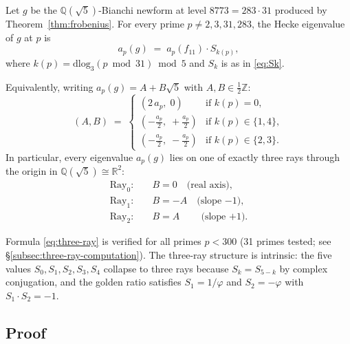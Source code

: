 \begin{theorem}
\label{thm:three-ray}
Let $g$ be the $\mathbb{Q}(\sqrt{5})$-Bianchi newform at level $8773 = 283
\cdot 31$ produced by Theorem~\ref{thm:frobenius}. For every prime
$p \neq 2, 3, 31, 283$, the Hecke eigenvalue of $g$ at $p$ is
\begin{equation}
\label{eq:three-ray}
  a_p(g) \;=\; a_p(f_{11}) \cdot S_{k(p)},
\end{equation}
where $k(p) = \mathrm{dlog}_3(p \bmod 31) \bmod 5$ and $S_k$ is as in
\eqref{eq:Sk}.

Equivalently, writing $a_p(g) = A + B\sqrt{5}$ with
$A, B \in \tfrac{1}{2}\mathbb{Z}$:
\begin{equation}
\label{eq:three-ray-coords}
  (A, B) \;=\; \begin{cases}
    (2\,a_p,\; 0)          & \text{if } k(p) = 0, \\[4pt]
    (-\tfrac{a_p}{2},\; +\tfrac{a_p}{2}) & \text{if } k(p) \in \{1,4\}, \\[4pt]
    (-\tfrac{a_p}{2},\; -\tfrac{a_p}{2}) & \text{if } k(p) \in \{2,3\}.
  \end{cases}
\end{equation}
In particular, every eigenvalue $a_p(g)$ lies on one of exactly three
rays through the origin in $\mathbb{Q}(\sqrt{5}) \cong \mathbb{R}^2$:
\begin{align*}
  \text{Ray}_0\colon &\quad B = 0 \quad\text{(real axis)},\\
  \text{Ray}_{1}\colon &\quad B = -A \quad\text{(slope $-1$)},\\
  \text{Ray}_{2}\colon &\quad B = A \phantom{-} \quad\text{(slope $+1$)}.
\end{align*}
\end{theorem}

\begin{remark}
Formula \eqref{eq:three-ray} is verified for all primes $p < 300$
(31 primes tested; see \S\ref{subsec:three-ray-computation}).
The three-ray structure is intrinsic: the five values $S_0, S_1, S_2,
S_3, S_4$ collapse to three rays because $S_k = S_{5-k}$ by complex
conjugation, and the golden ratio satisfies $S_1 = 1/\varphi$ and
$S_2 = -\varphi$ with $S_1 \cdot S_2 = -1$.
\end{remark}

\subsection{Proof}
\label{subsec:three-ray-proof}


